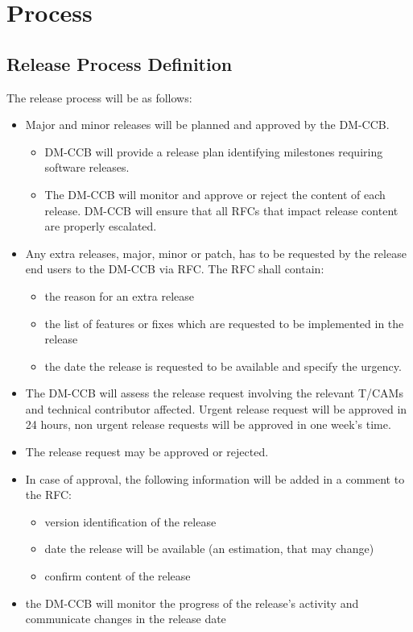 \section{Process} \label{sec:process}

\subsection{Release Process Definition}

The release process will be as follows:

\begin{itemize}
\item Major and minor releases will be planned and approved by the DM-CCB.
\begin{itemize}
  \item  DM-CCB will provide  a release plan identifying  milestones requiring software releases.
  \item The DM-CCB will monitor and approve or reject the content of each release. DM-CCB will ensure that  all RFCs that impact  release content are properly escalated.
\end{itemize}
\item Any extra releases, major, minor or patch, has to be requested by the release end users to the DM-CCB via \gls{RFC}. The \gls{RFC} shall contain:
\begin{itemize}
  \item the reason for an extra release
  \item the list of features or fixes which are requested to be implemented in the release
  \item the date the release is requested to be available and specify the urgency.
\end{itemize}
\item The DM-CCB will assess the release request involving the relevant T/CAMs and technical contributor affected.
Urgent release request will be approved in 24 hours, non urgent release requests will be approved in one week's time.
\item The release request may be approved or rejected.
\item In case of approval, the following information will be added in a comment to the RFC:
\begin{itemize}
  \item version identification of the release
  \item date the release will be available (an estimation, that may change)
  \item confirm content of the release
\end{itemize}
\item the DM-CCB will monitor the progress of the release's activity and communicate changes in the release date
\end{itemize}


